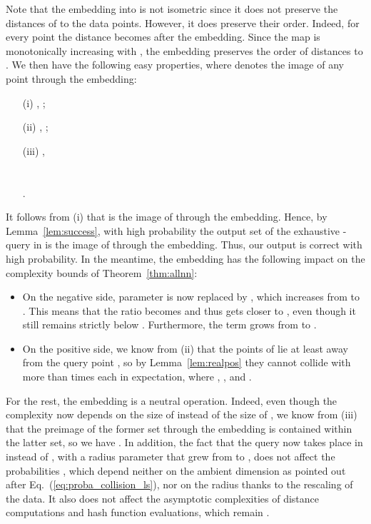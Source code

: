 Note that the embedding into  is not isometric since it
does not preserve the distances of  to the data points. However, it
does preserve their order. Indeed, for every point  the distance
 becomes 
after the embedding. Since the map
 is monotonically
increasing with , the embedding preserves the order of
distances to . We then have the following easy properties, where  denotes the image of any point  through the
embedding:
\begin{itemize}
\item[\rm (i)] , ;
\item[\rm (ii)] , ;
\item[\rm (iii)] , \\\\\\.
\end{itemize}
It follows from (i) that  is the image of
 through the embedding. Hence, by
Lemma~\ref{lem:success}, with high probability the output set of the
exhaustive -\pleb query in  is the image of
 through the embedding. Thus, our output is correct
with high probability. In the meantime, the embedding has the
following impact on the complexity bounds of Theorem~\ref{thm:allnn}:
\begin{itemize}
\item On the negative side, parameter  is now replaced by
  , which
  increases  from  to . This means
  that the ratio  becomes
   and thus gets closer to , even though it still
  remains strictly below . Furthermore, the term  grows from
   to .
\item On the positive side, we know from (ii) that the points of 
  lie at least  away from the query point , so by
  Lemma~\ref{lem:realpos} they cannot collide with  more than
   times each in expectation, where
  , , and
  .
\end{itemize}
For the rest, the embedding is a neutral operation. Indeed, even
though the complexity now depends on the size of
 instead of the size of
, we know from (iii) that the preimage of the
former set through the embedding is contained within the latter set,
so we have .
In addition, the fact that the query now takes place in 
instead of , with a radius parameter that grew from  to ,
does not affect the probabilities , which depend neither on
the ambient dimension as pointed out after
Eq.~(\ref{eq:proba_collision_ls}), nor on the radius thanks to the
rescaling of the data. It also does not affect the asymptotic complexities
of distance computations and hash function evaluations, which remain
.

